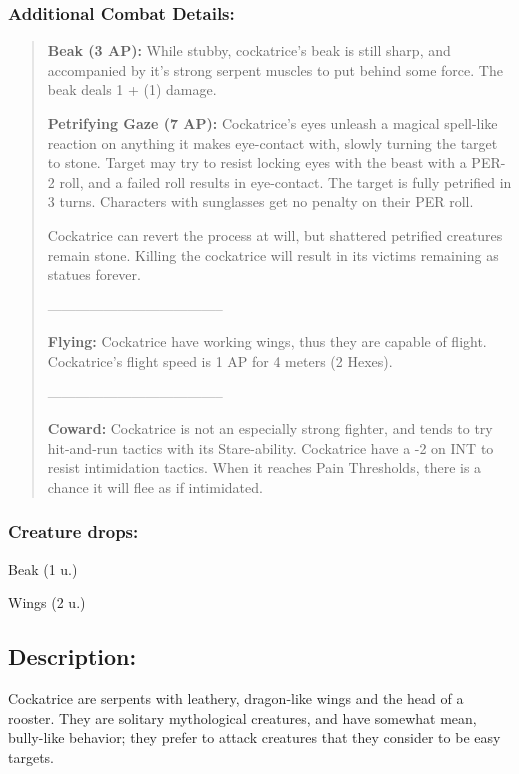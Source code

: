 \documentclass[11pt,a4paper,twocolumn]{book}
\begin{document}
	\subsubsection*{Additional Combat Details:}
	\begin{verse}
		\textbf{Beak (3 AP):} While stubby, cockatrice's beak is still sharp, and accompanied by it's strong serpent muscles to put behind some force. The beak deals 1 + (1) damage.
		
		\textbf{Petrifying Gaze (7 AP):} Cockatrice's eyes unleash a magical spell-like reaction on anything it makes eye-contact with, slowly turning the target to stone. Target may try to resist locking eyes with the beast with a PER-2 roll, and a failed roll results in eye-contact. The target is fully petrified in 3 turns. Characters with sunglasses get no penalty on their PER roll.
		
		Cockatrice can revert the process at will, but shattered petrified creatures remain stone. Killing the cockatrice will result in its victims remaining as statues forever. 
		
		--------------------------------------
				
		\textbf{Flying:} Cockatrice have working wings, thus they are capable of flight. Cockatrice's flight speed is 1 AP for 4 meters (2 Hexes).
		
		--------------------------------------
		
		\textbf{Coward:} Cockatrice is not an especially strong fighter, and tends to try hit-and-run tactics with its Stare-ability. Cockatrice have a -2 on INT to resist intimidation tactics. When it reaches Pain Thresholds, there is a chance it will flee as if intimidated.
	
	\end{verse}
	
	\subsubsection*{Creature drops:}
	\begin{compactitem}
		\item Beak (1 u.)
		\item Wings (2 u.)
	\end{compactitem}	
	
	\subsection*{Description:}
	Cockatrice are serpents with leathery, dragon-like wings and the head of a rooster. They are solitary mythological creatures, and have somewhat mean, bully-like behavior; they prefer to attack creatures that they consider to be easy targets. 
	
\end{document}
